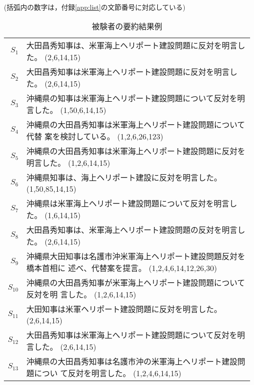 \begin{table}[!h]
\begin{center}
\caption{被験者の要約結果例}
(括弧内の数字は，付録\ref{app:list}の文節番号に対応している)\\
\vspace{2mm}
\begin{tabular}{r p{100mm}}
\hline
$S_{1}$ &  大田昌秀知事は、米軍海上ヘリポート建設問題に反対を明言した。
 (2,6,14,15) \\
$S_{2}$ &  大田昌秀知事は米軍海上ヘリポート建設問題に反対を明言した。
 (2,6,14,15) \\
$S_{3}$ &  沖縄県の知事は米軍海上ヘリポート建設問題について反対を明言した。
 (1,50,6,14,15) \\
$S_{4}$ &  沖縄県の大田昌秀知事は米軍海上ヘリポート建設問題について代替
 案を検討している。 (1,2,6,26,123) \\
$S_{5}$ &  沖縄県の大田昌秀知事は米軍海上へリポート建設問題に反対を明言した。
 (1,2,6,14,15) \\
$S_{6}$ &  沖縄県知事は、海上ヘリポート建設に反対を明言した。
(1,50,85,14,15) \\
$S_{7}$ &  沖縄県は米軍海上ヘリポート建設問題について反対を明言した。
 (1,6,14,15) \\
$S_{8}$ &  大田昌秀知事は、米軍海上へリポート建設問題の反対を明言した。
  (2,6,14,15) \\
$S_{9}$ &  沖縄県大田知事は名護市沖米軍海上ヘリポート建設問題反対を橋本首相に
  述べ、代替案を提言。 (1,2,4,6,14,12,26,30) \\
$S_{10}$ &  沖縄県の大田昌秀知事が米軍海上ヘリポート建設問題について反対を明
  言した。  (1,2,6,14,15) \\
$S_{11}$ &  大田知事は米軍ヘリポート建設問題に反対を明言した。
 (2,6,14,15)  \\
$S_{12}$ &  大田昌秀知事は米軍海上へリポート建設問題について反対を明言した。
 (2,6,14,15)  \\
$S_{13}$ &  沖縄県の大田昌秀知事は名護市沖の米軍海上ヘリポート建設問題につい
 て反対を明言した。 (1,2,4,6,14,15)  \\
\hline
\end{tabular}
\end{center}
\end{table}


